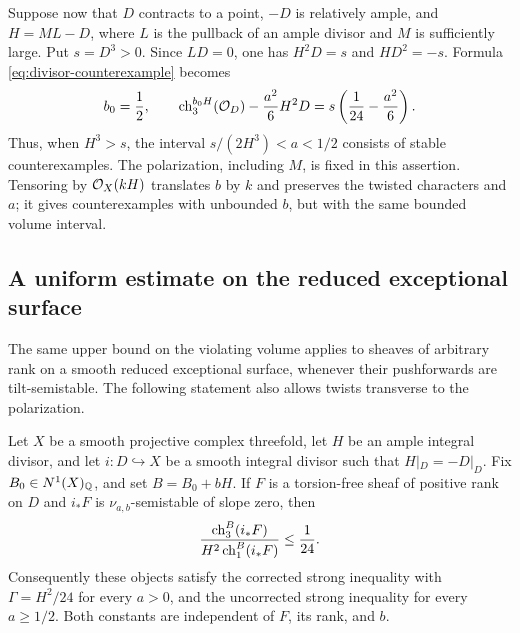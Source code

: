 Suppose now that \(D\) contracts to a point, \(-D\) is relatively
ample, and \(H=ML-D\), where \(L\) is the pullback of an ample
divisor and \(M\) is sufficiently large.  Put \(s=D^3>0\).
Since \(LD=0\),
one has \(H^2D=s\) and \(HD^2=-s\).  Formula
\eqref{eq:divisor-counterexample} becomes
\begin{equation}
 b_0=\frac12,
 \qquad
 \operatorname{ch}_3^{b_0H}(\mathcal O_D)-\frac{a^2}{6}H^2D
 =s\left(\frac1{24}-\frac{a^2}{6}\right).
 \label{eq:contracted-defect}
\end{equation}
Thus, when \(H^3>s\), the interval
\(s/(2H^3)<a<1/2\) consists of stable counterexamples.
The polarization, including \(M\), is fixed in this assertion.
Tensoring by \(\mathcal O_X(kH)\) translates \(b\) by \(k\) and preserves
the twisted characters and \(a\); it gives counterexamples with
unbounded \(b\), but with the same bounded volume interval.

\subsection{A uniform estimate on the reduced exceptional surface}

The same upper bound on the violating volume applies to sheaves of
arbitrary rank on a smooth reduced exceptional surface, whenever their
pushforwards are tilt-semistable.  The following statement also allows
twists transverse to the polarization.

\begin{lemma}
\label{lem:exceptional-surface-bound}
Let \(X\) be a smooth projective complex threefold, let \(H\) be an
ample integral divisor, and let \(i:D\hookrightarrow X\) be a smooth
integral divisor such that \(H|_D=-D|_D\).  Fix
\(B_0\in N^1(X)_{\mathbb Q}\), and set \(B=B_0+bH\).
If \(F\) is a torsion-free sheaf of positive rank on \(D\) and
\(i_*F\) is \(\nu_{a,b}\)-semistable of slope zero, then
\begin{equation}
 \frac{\operatorname{ch}_3^B(i_*F)}{H^2\operatorname{ch}_1^B(i_*F)}\le\frac1{24}.
 \label{eq:exceptional-uniform}
\end{equation}
Consequently these objects satisfy the corrected strong inequality
with \(\Gamma=H^2/24\) for every \(a>0\), and the uncorrected strong
inequality for every \(a\ge1/2\).  Both constants are independent of
\(F\), its rank, and \(b\).
\end{lemma}

